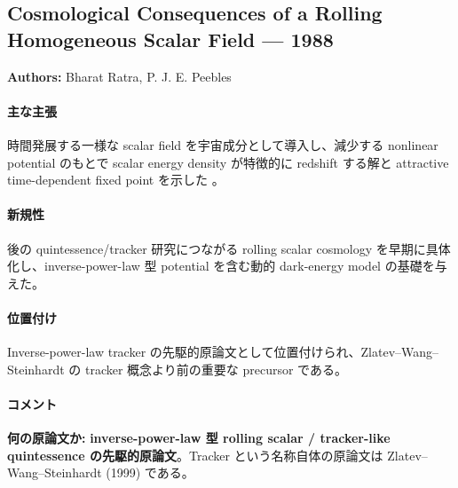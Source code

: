 \subsection{Cosmological Consequences of a Rolling Homogeneous Scalar Field --- 1988}

\textbf{Authors:} Bharat Ratra, P. J. E. Peebles

\paragraph{主な主張}
時間発展する一様な scalar field を宇宙成分として導入し、減少する nonlinear potential のもとで scalar energy density が特徴的に redshift する解と attractive time-dependent fixed point を示した \cite{Ratra:1988rolling}。

\paragraph{新規性}
後の quintessence/tracker 研究につながる rolling scalar cosmology を早期に具体化し、inverse-power-law 型 potential を含む動的 dark-energy model の基礎を与えた。

\paragraph{位置付け}
Inverse-power-law tracker の先駆的原論文として位置付けられ、Zlatev--Wang--Steinhardt の tracker 概念より前の重要な precursor である。

\paragraph{コメント}
\textbf{何の原論文か:} \textbf{inverse-power-law 型 rolling scalar / tracker-like quintessence の先駆的原論文}。Tracker という名称自体の原論文は Zlatev--Wang--Steinhardt (1999) である。
